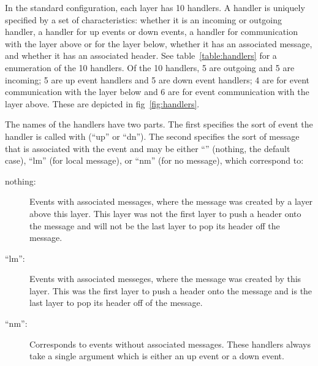 In the standard configuration, each layer has 10 handlers.  A handler is
uniquely specified by a set of characteristics: whether it is an incoming
or outgoing handler, a handler for up events or down events, a handler for
communication with the layer above or for the layer below, whether it has
an associated message, and whether it has an associated header.  See
table~\ref{table:handlers} for a enumeration of the 10 handlers.  Of the 10
handlers, 5 are outgoing and 5 are incoming; 5 are up event handlers and 5
are down event handlers; 4 are for event communication with the layer below
and 6 are for event communication with the layer above.  These are depicted
in fig~\ref{fig:handlers}.

The names of the handlers have two parts.  The first specifies the sort of
event the handler is called with (``up'' or ``dn'').  The second specifies
the sort of message that is associated with the event and may be either
``'' (nothing, the default case), ``lm'' (for local message), or ``nm''
(for no message), which correspond to:
\begin{description}
\item
[nothing:] Events with associated messages, where the message was created
by a layer above this layer.  This layer was not the first layer to push a
header onto the message and will not be the last layer to pop its header
off the message.
\item
[``lm'':] Events with associated messeges, where the
message was created by this layer.  This was the first layer to push a
header onto the message and is the last layer to pop its header off of the
message.
\item
[``nm'':] Corresponds to events without associated messages.
These handlers always take a single argument which is either an up event or
a down event.
\end{description}
